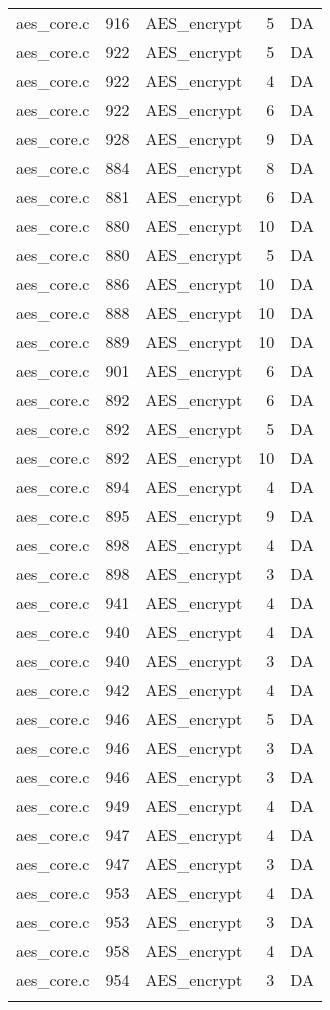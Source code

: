 \begin{table}[h]
{\begin{tabular}{clrrr}
aes\_core.c&916&AES\_encrypt&5 &DA\\
aes\_core.c&922&AES\_encrypt&5 &DA\\
aes\_core.c&922&AES\_encrypt&4 &DA\\
aes\_core.c&922&AES\_encrypt&6 &DA\\
aes\_core.c&928&AES\_encrypt&9 &DA\\
aes\_core.c&884&AES\_encrypt&8 &DA\\
aes\_core.c&881&AES\_encrypt&6 &DA\\
aes\_core.c&880&AES\_encrypt&10&DA\\
aes\_core.c&880&AES\_encrypt&5 &DA\\
aes\_core.c&886&AES\_encrypt&10&DA\\
aes\_core.c&888&AES\_encrypt&10&DA\\
aes\_core.c&889&AES\_encrypt&10&DA\\
aes\_core.c&901&AES\_encrypt&6 &DA\\
aes\_core.c&892&AES\_encrypt&6 &DA\\
aes\_core.c&892&AES\_encrypt&5 &DA\\
aes\_core.c&892&AES\_encrypt&10&DA\\
aes\_core.c&894&AES\_encrypt&4 &DA\\
aes\_core.c&895&AES\_encrypt&9 &DA\\
aes\_core.c&898&AES\_encrypt&4 &DA\\
aes\_core.c&898&AES\_encrypt&3 &DA\\
aes\_core.c&941&AES\_encrypt&4 &DA\\
aes\_core.c&940&AES\_encrypt&4 &DA\\
aes\_core.c&940&AES\_encrypt&3 &DA\\
aes\_core.c&942&AES\_encrypt&4 &DA\\
aes\_core.c&946&AES\_encrypt&5 &DA\\
aes\_core.c&946&AES\_encrypt&3 &DA\\
aes\_core.c&946&AES\_encrypt&3 &DA\\
aes\_core.c&949&AES\_encrypt&4 &DA\\
aes\_core.c&947&AES\_encrypt&4 &DA\\
aes\_core.c&947&AES\_encrypt&3 &DA\\
aes\_core.c&953&AES\_encrypt&4 &DA\\
aes\_core.c&953&AES\_encrypt&3 &DA\\
aes\_core.c&958&AES\_encrypt&4 &DA\\
aes\_core.c&954&AES\_encrypt&3 &DA\\
&&&&\\
\hline
\end{tabular}
}
\end{table}